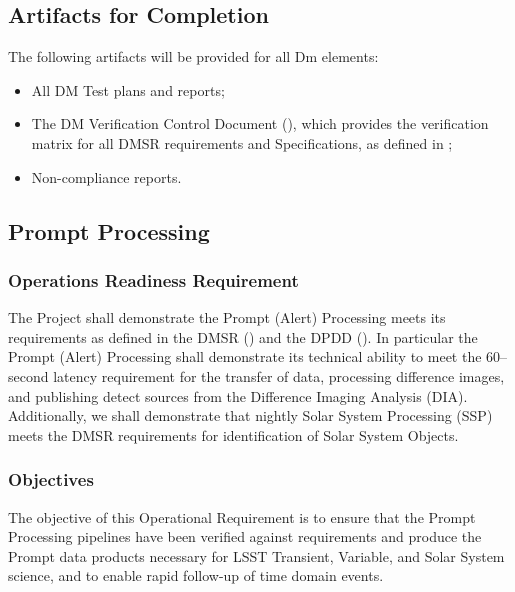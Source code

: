 \subsection{Artifacts for Completion}

The following artifacts will be provided for all Dm elements:

\begin{itemize}
	\item All DM Test plans and reports;
	\item The DM Verification Control Document (), which provides the verification matrix for all DMSR requirements and Specifications, as defined in ;
	\item Non-compliance reports.
\end{itemize}


\subsection{Prompt Processing}

\subsubsection{Operations Readiness Requirement}
The Project shall demonstrate the Prompt (Alert) Processing meets its requirements as defined in the DMSR () and the DPDD ().  In particular the Prompt (Alert) Processing shall demonstrate its technical ability to meet the 60--second latency requirement for the transfer of data, processing difference images, and publishing detect sources from the Difference Imaging Analysis (DIA).
Additionally, we shall demonstrate that nightly Solar System Processing (SSP) meets the DMSR requirements for identification of Solar System Objects.

\subsubsection{Objectives} 

The objective of this Operational Requirement is to ensure that the Prompt Processing pipelines have been verified against requirements and produce the Prompt data products necessary for LSST Transient, Variable, and Solar System science, and to enable rapid follow-up of time domain events. 

